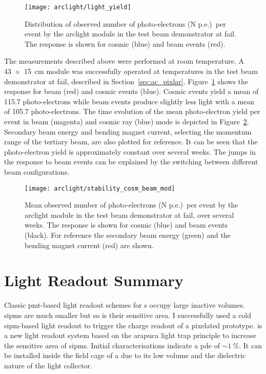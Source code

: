 \begin{figure}[tbp]
	\centering
	\texttt{[image: arclight/light\_yield]}
	\caption[\pixlar{}  response]{%
		Distribution of observed number of photo-electrons (N p.e.)\ per event by the \acrshort{arclight} module in the \pixlar{} test beam demonstrator at \acrshort{fail}.
		The response is shown for cosmic (blue) and beam events (red).
	}
	\label{fig:arclight_pixlar_response}
\end{figure}

The measurements described above were performed at room temperature.
A \SI{43 x 15}{\centi\metre} \AL{} module was successfully operated at \lar{} temperatures in the \pixlar{} test beam demonstrator at \gls{fail}, described in Section~\ref{sec:ac_pixlar}.
Figure~\ref{fig:arclight_pixlar_response} shows the response for beam (red) and cosmic events (blue).
Cosmic events yield a mean of \num{115.7} photo-electrons while beam events produce slightly less light with a mean of \num{105.7} photo-electrons.
The time evolution of the mean photo-electron yield per event in beam (magenta) and cosmic ray (blue) mode is depicted in Figure~\ref{fig:arclight_pixlar_stability}.
Secondary beam energy and bending magnet current, selecting the momentum range of the tertiary beam, are also plotted for reference.
It can be seen that the photo-electron yield is approximately constant over several weeks.
The jumps in the response to beam events can be explained by the switching between different beam configurations.

\begin{figure}[tbp]
	\centering
	\texttt{[image: arclight/stability\_cosm\_beam\_mod]}
	\caption[\pixlar{}  response stability]{%
		Mean observed number of photo-electrons (N p.e.)\ per event by the \acrshort{arclight} module in the \pixlar{} test beam demonstrator at \acrshort{fail}, over several weeks.
		The response is shown for cosmic (blue) and beam events (black).
		For reference the secondary beam energy (green) and the bending magnet current (red) are shown.
	}
	\label{fig:arclight_pixlar_stability}
\end{figure}


\section{Light Readout Summary}
\label{sec:studies_light-col-summary}

Classic \gls{pmt}-based light readout schemes for \lartpc{}s occupy large inactive volumes.
\glspl{sipm} are much smaller but so is their sensitive area.
I successfully used a cold \gls{sipm}-based light readout to trigger the charge readout of a pixelated \lartpc{} prototype.
\AL{} is a new light readout system based on the \gls{arapuca} light trap principle to increase the sensitive area of \glspl{sipm}.
Initial characterisations indicate a \gls{pde} of $\sim{\SI{1}{\percent}}$.
It can be installed inside the field cage of a \lartpc{} due to its low volume and the dielectric nature of the light collector.